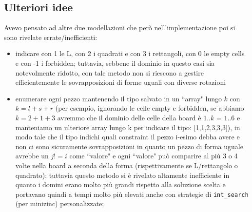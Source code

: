 \documentclass{article}
\begin{document}
\subsection{Ulteriori idee}
Avevo pensato ad altre due modellazioni che però nell'implementazione poi si sono rivelate errate/inefficienti:
\begin{itemize}
    \item indicare con 1 le L, con 2 i quadrati e con 3 i rettangoli, con 0 le empty cells e con -1 i forbidden; tuttavia, sebbene il dominio in questo casi sia notevolmente ridotto, con tale metodo non si riescono a gestire efficientemente le sovrapposizioni di forme uguali con diverse rotazioni
    \item enumerare ogni pezzo mantenendo il tipo salvato in un ``array" lungo $k$ con $k=l+s+r$ (per esempio, ignorando le celle empty e forbidden, se abbiamo $k=2+1+3$ avremmo che il dominio delle celle della board è $1..k$ = $1..6$ e manteniamo un ulteriore array lungo k per indicare il tipo: [1,1,2,3,3,3]), in modo tale che il tipo indichi quali constraint il pezzo i-esimo debba avere e non ci sono sicuramente sovrapposizioni in quanto un pezzo di forma uguale avrebbe un $j!=i$ come ``valore" e ogni ``valore" può comparire al più 3 o 4 volte nella board a seconda della forma (rispettivamente se L/rettangolo o quadrato); tuttavia questo metodo si è rivelato altamente inefficiente in quanto i domini erano molto più grandi rispetto alla soluzione scelta e portavano quindi a tempi molto più elevati anche con strategie di \texttt{int\_search} (per minizinc) personalizzate;
\end{itemize}
\end{document}
